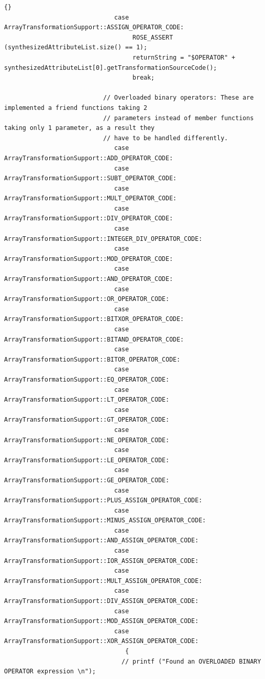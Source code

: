 \documentclass[10pt]{article}
\begin{document}
{\begin{lstlisting}{}
                              case ArrayTransformationSupport::ASSIGN_OPERATOR_CODE:
                                   ROSE_ASSERT (synthesizedAttributeList.size() == 1);
                                   returnString = "$OPERATOR" + synthesizedAttributeList[0].getTransformationSourceCode();
                                   break;

                           // Overloaded binary operators: These are implemented a friend functions taking 2
                           // parameters instead of member functions taking only 1 parameter, as a result they
                           // have to be handled differently.
                              case ArrayTransformationSupport::ADD_OPERATOR_CODE:
                              case ArrayTransformationSupport::SUBT_OPERATOR_CODE:
                              case ArrayTransformationSupport::MULT_OPERATOR_CODE:
                              case ArrayTransformationSupport::DIV_OPERATOR_CODE:
                              case ArrayTransformationSupport::INTEGER_DIV_OPERATOR_CODE:
                              case ArrayTransformationSupport::MOD_OPERATOR_CODE:
                              case ArrayTransformationSupport::AND_OPERATOR_CODE:
                              case ArrayTransformationSupport::OR_OPERATOR_CODE:
                              case ArrayTransformationSupport::BITXOR_OPERATOR_CODE:
                              case ArrayTransformationSupport::BITAND_OPERATOR_CODE:
                              case ArrayTransformationSupport::BITOR_OPERATOR_CODE:
                              case ArrayTransformationSupport::EQ_OPERATOR_CODE:
                              case ArrayTransformationSupport::LT_OPERATOR_CODE:
                              case ArrayTransformationSupport::GT_OPERATOR_CODE:
                              case ArrayTransformationSupport::NE_OPERATOR_CODE:
                              case ArrayTransformationSupport::LE_OPERATOR_CODE:
                              case ArrayTransformationSupport::GE_OPERATOR_CODE:
                              case ArrayTransformationSupport::PLUS_ASSIGN_OPERATOR_CODE:
                              case ArrayTransformationSupport::MINUS_ASSIGN_OPERATOR_CODE:
                              case ArrayTransformationSupport::AND_ASSIGN_OPERATOR_CODE:
                              case ArrayTransformationSupport::IOR_ASSIGN_OPERATOR_CODE:
                              case ArrayTransformationSupport::MULT_ASSIGN_OPERATOR_CODE:
                              case ArrayTransformationSupport::DIV_ASSIGN_OPERATOR_CODE:
                              case ArrayTransformationSupport::MOD_ASSIGN_OPERATOR_CODE:
                              case ArrayTransformationSupport::XOR_ASSIGN_OPERATOR_CODE:
                                 {
                                // printf ("Found an OVERLOADED BINARY OPERATOR expression \n");


\end{lstlisting}}
\end{document}
